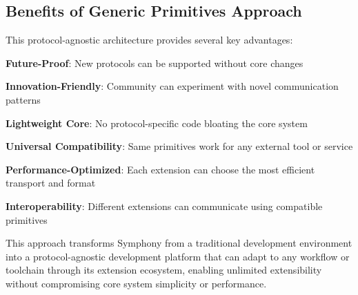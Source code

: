 \subsection*{Benefits of Generic Primitives Approach}

This protocol-agnostic architecture provides several key advantages:

\begin{compactlist}
    \item \textbf{Future-Proof}: New protocols can be supported without core changes
    \item \textbf{Innovation-Friendly}: Community can experiment with novel communication patterns
    \item \textbf{Lightweight Core}: No protocol-specific code bloating the core system
    \item \textbf{Universal Compatibility}: Same primitives work for any external tool or service
    \item \textbf{Performance-Optimized}: Each extension can choose the most efficient transport and format
    \item \textbf{Interoperability}: Different extensions can communicate using compatible primitives
\end{compactlist}

This approach transforms Symphony from a traditional development environment into a protocol-agnostic development platform that can adapt to any workflow or toolchain through its extension ecosystem, enabling unlimited extensibility without compromising core system simplicity or performance.
